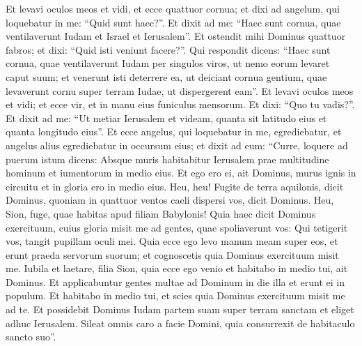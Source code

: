 \begin{biblechapter}
\begin{biblechapter}
\verse Et levavi oculos meos et vidi, et ecce quattuor cornua; 
\verse et dixi ad angelum, qui loquebatur in me: “Quid sunt haec?”. Et dixit ad me: “Haec sunt cornua, quae ventilaverunt Iudam et Israel et Ierusalem”. 
\verse Et ostendit mihi Dominus quattuor fabros; 
\verse et dixi: “Quid isti veniunt facere?”. Qui respondit dicens: “Haec sunt cornua, quae ventilaverunt Iudam per singulos viros, ut nemo eorum levaret caput suum; et venerunt isti deterrere ea, ut deiciant cornua gentium, quae levaverunt cornu super terram Iudae, ut dispergerent eam”.
 \verse Et levavi oculos meos et vidi; et ecce vir, et in manu eius funiculus mensorum. 
\verse Et dixi: “Quo tu vadis?”. Et dixit ad me: “Ut metiar Ierusalem et videam, quanta sit latitudo eius et quanta longitudo eius”.
 \verse Et ecce angelus, qui loquebatur in me, egrediebatur, et angelus alius egrediebatur in occursum eius; 
\verse et dixit ad eum: “Curre, loquere ad puerum istum dicens: Absque muris habitabitur Ierusalem prae multitudine hominum et iumentorum in medio eius. 
\verse Et ego ero ei, ait Dominus, murus ignis in circuitu et in gloria ero in medio eius.
 \verse Heu, heu! Fugite de terra aquilonis, dicit Dominus, quoniam in quattuor ventos caeli dispersi vos, dicit Dominus. 
\verse Heu, Sion, fuge, quae habitas apud filiam Babylonis! 
\verse Quia haec dicit Dominus exercituum, cuius gloria misit me ad gentes, quae spoliaverunt vos: Qui tetigerit vos, tangit pupillam oculi mei. 
\verse Quia ecce ego levo manum meam super eos, et erunt praeda servorum suorum; et cognoscetis quia Dominus exercituum misit me.
 \verse Iubila et laetare, filia Sion,
 quia ecce ego venio
 et habitabo in medio tui,
 ait Dominus.
 \verse Et applicabuntur gentes multae
 ad Dominum in die illa
 et erunt ei in populum.
 Et habitabo in medio tui,
 et scies quia Dominus exercituum
 misit me ad te.
 \verse Et possidebit Dominus Iudam
 partem suam super terram sanctam
 et eliget adhuc Ierusalem.
 \verse Sileat omnis caro a facie Domini,
 quia consurrexit de habitaculo sancto suo”.
 

\end{biblechapter}
\end{biblechapter}
